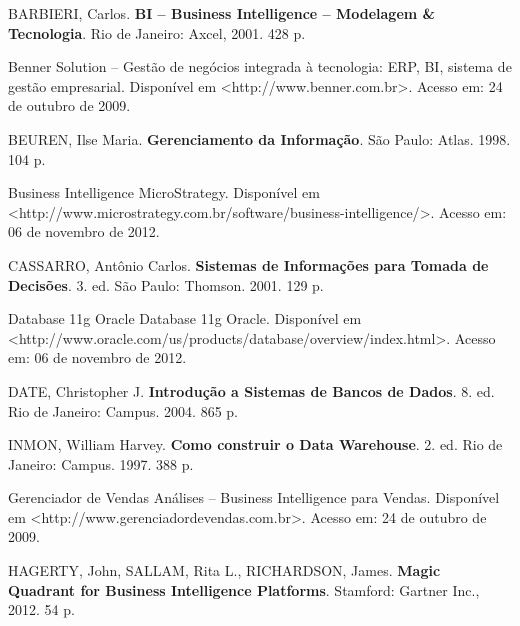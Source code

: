 \documentclass[a4paper]{article}
\begin{document}
\bigskip

{
\textsf{BARBIERI, Carlos. }\textsf{\textbf{BI -- Business Intelligence -- Modelagem \& Tecnologia}}\textsf{. Rio de
Janeiro: Axcel, 2001. 428 p. }}

{
\textsf{Benner Solution -- Gest\~ao de neg\'ocios integrada \`a tecnologia: ERP, BI, sistema de gest\~ao empresarial.
Dispon\'ivel em {\textless}http://www.benner.com.br{\textgreater}. Acesso em: 24 de outubro de 2009.}}

{
\textsf{BEUREN, Ilse Maria. }\textsf{\textbf{Gerenciamento da Informa\c{c}\~ao}}\textsf{.
}\foreignlanguage{english}{\textsf{S\~ao Paulo: Atlas. 1998. 104 p. }}}

{
\textsf{Business Intelligence {\textbar} MicroStrategy. Dispon\'ivel em
{\textless}http://www.microstrategy.com.br/software/business-intelligence/{\textgreater}. Acesso em: 06 de novembro de
2012.}}

{
\textsf{CASSARRO, Ant\^onio Carlos. }\textsf{\textbf{Sistemas de Informa\c{c}\~oes para Tomada de Decis\~oes}}\textsf{.
3. ed. S\~ao Paulo: Thomson. 2001. 129 p. }}

{
\textsf{Database 11g {\textbar} Oracle Database 11g {\textbar} Oracle. Dispon\'ivel em
{\textless}http://www.oracle.com/us/products/database/overview/index.html{\textgreater}. Acesso em: 06 de novembro de
2012.}}

{
\textsf{DATE, Christopher J. }\textsf{\textbf{Introdu\c{c}\~ao a Sistemas de Bancos de Dados}}\textsf{. 8. ed. Rio de
Janeiro: Campus. }\foreignlanguage{english}{\textsf{2004. 865 p. }}}

{
\foreignlanguage{english}{\textsf{INMON, William Harvey. }}\foreignlanguage{english}{\textsf{\textbf{Como construir o
Data Warehouse}}}\foreignlanguage{english}{\textsf{. 2. ed. }}\textsf{Rio de Janeiro: Campus. 1997. 388 p. }}

{
\textsf{Gerenciador de Vendas An\'alises -- Business Intelligence para Vendas. Dispon\'ivel em
{\textless}http://www.gerenciadordevendas.com.br{\textgreater}. Acesso em: 24 de outubro de 2009. }}

{
\foreignlanguage{english}{\textsf{HAGERTY, John, SALLAM, Rita L., RICHARDSON, James.
}}\foreignlanguage{english}{\textsf{\textbf{Magic Quadrant for Business Intelligence
Platforms}}}\foreignlanguage{english}{\textsf{. Stamford: Gartner Inc., 2012. 54 p.}}}
\end{document}
